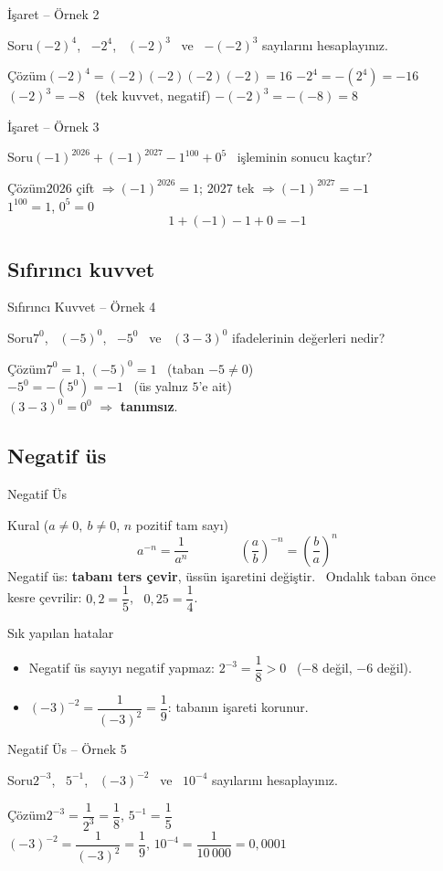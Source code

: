 \documentclass[aspectratio=169,11pt]{beamer}
\newcommand{\soru}[3]{%
\begin{frame}{#1}
  \begin{block}{Soru}\large #2\end{block}
  \pause
  \begin{exampleblock}{Çözüm}\large #3\end{exampleblock}
\end{frame}}
\begin{document}
\soru{İşaret -- Örnek 2}
{\((-2)^4\), \ \(-2^4\), \ \((-2)^3\) \ ve \ \(-(-2)^3\) sayılarını hesaplayınız.}
{\((-2)^4=(-2)(-2)(-2)(-2)=16\) \qquad \(-2^4=-(2^4)=-16\)\\[4pt]
\((-2)^3=-8\) \ (tek kuvvet, negatif) \qquad \(-(-2)^3=-(-8)=8\)}

\soru{İşaret -- Örnek 3}
{\((-1)^{2026}+(-1)^{2027}-1^{100}+0^{5}\) \ işleminin sonucu kaçtır?}
{\(2026\) çift \(\Rightarrow (-1)^{2026}=1\); \quad \(2027\) tek \(\Rightarrow (-1)^{2027}=-1\)\\[4pt]
\(1^{100}=1\), \quad \(0^5=0\)
\[1+(-1)-1+0=-1\]}

\subsection{Sıfırıncı kuvvet}
\soru{Sıfırıncı Kuvvet -- Örnek 4}
{\(7^0\), \ \((-5)^0\), \ \(-5^0\) \ ve \ \((3-3)^0\) ifadelerinin değerleri nedir?}
{\(7^0=1\), \qquad \((-5)^0=1\) \ (taban \(-5\neq 0\))\\[4pt]
\(-5^0=-(5^0)=-1\) \ (üs yalnız \(5\)'e ait)\\[4pt]
\((3-3)^0=0^0\) \(\Rightarrow\) \textbf{tanımsız}.}

\subsection{Negatif üs}
\begin{frame}{Negatif Üs}
\begin{block}{Kural (\(a\neq 0,\ b\neq 0\), \(n\) pozitif tam sayı)}
\[a^{-n}=\frac{1}{a^n}\qquad\qquad \left(\frac{a}{b}\right)^{-n}=\left(\frac{b}{a}\right)^{n}\]
Negatif üs: \textbf{tabanı ters çevir}, üssün işaretini değiştir. \ Ondalık taban önce kesre çevrilir: \(0{,}2=\dfrac15\), \ \(0{,}25=\dfrac14\).
\end{block}
\begin{alertblock}{Sık yapılan hatalar}
\begin{itemize}
\item Negatif üs sayıyı negatif yapmaz: \(2^{-3}=\dfrac18>0\) \ (\(-8\) değil, \(-6\) değil).
\item \((-3)^{-2}=\dfrac{1}{(-3)^2}=\dfrac19\): tabanın işareti korunur.
\end{itemize}
\end{alertblock}
\end{frame}

\soru{Negatif Üs -- Örnek 5}
{\(2^{-3}\), \ \(5^{-1}\), \ \((-3)^{-2}\) \ ve \ \(10^{-4}\) sayılarını hesaplayınız.}
{\(2^{-3}=\dfrac{1}{2^3}=\dfrac18\), \qquad \(5^{-1}=\dfrac15\)\\[4pt]
\((-3)^{-2}=\dfrac{1}{(-3)^2}=\dfrac19\), \qquad \(10^{-4}=\dfrac{1}{10\,000}=0{,}0001\)}
\end{document}
